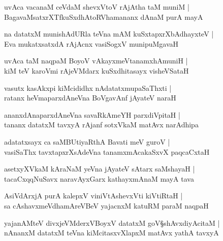 \begin{shloka}
uvAca vacanaM ceVdaM shevxVtoV rAjAtha taM muniM |\\
BagavaMsatxrXTfkuSxdhAtoRVhamananx dAnaM purA mayA
\end{shloka}

\begin{shloka}
na datatxM munishAdURla teVna mAM kuSxtapxrXbAdhayxteV |\\
Eva mukatxsatxdA rAjAcnx vasiSogxV munipuMgavaH 
\end{shloka}

\begin{shloka}
uvAca taM naqpaM BoyoV vAkayxmeVtanamxhAmuniH |\\
kiM teV karoVmi rAjeVMdarx kuSxdhitasayx visheVSataH 
\end{shloka}

\begin{shloka}
vasutx kasAkxpi kiMcididhx nAdatatxmupaSaThxti |\\
ratanx heVmaparxdAneVna BoVgavAnf jAyateV naraH 
\end{shloka}

\begin{shloka}
ananxdAnaparxdAneVna savaRkAmeYH parxdiVpitaH |\\
tananx datatxM tavxyA rAjanf sotxVkaM matAvx narAdhipa 
\end{shloka}

\begin{shloka}
adatatxsayx ca saMBUtiyaRthA Bavati meV guroV |\\
vasiSaThx tavxtapxrXsAdeVna tanamxmAcakaSxvX paqcaCxtaH 
\end{shloka}

\begin{shloka}
asetxyXVkaM kAraNaM yeVna jAyateV sAtarx saMshayaH |\\
tacaCxqqNuSavx naravAyxGarx kathayxmAnaM mayA tava 
\end{shloka}

\begin{shloka}
AsiVdArxjA purA kalepxV viniVtAshevxVti kiVtiRtaH |\\
sa cAshavxmeVdhamAreVBeV yajacnxM katuRM paraM naqpaH 
\end{shloka}

\begin{shloka}
yajanAMteV divxjeVMderxVBoyxV datatxM goV\S shAvxdiyAcitaM |\\
nAnanxM datatxM teVna kiMcitasxvXlapxM matAvx yathA tavxyA 
\end{shloka}

